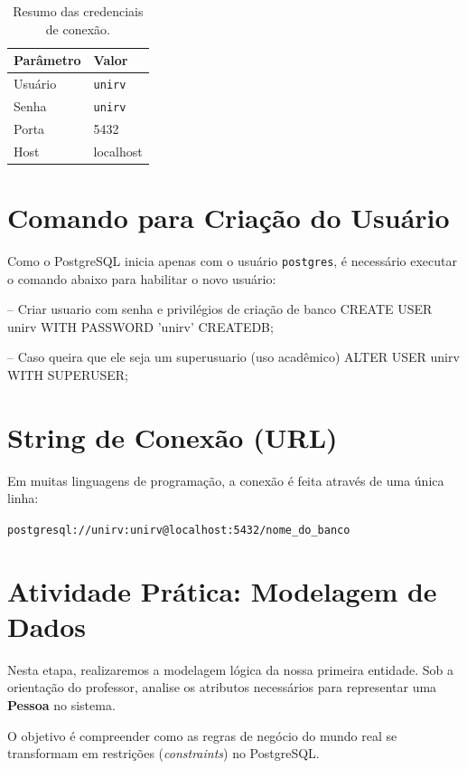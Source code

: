 \begin{table}[h!]
\centering
\begin{tabular}{|l|l|}
\hline
\textbf{Parâmetro} & \textbf{Valor} \\ \hline
Usuário            & \texttt{unirv} \\ \hline
Senha              & \texttt{unirv} \\ \hline
Porta              & 5432           \\ \hline
Host               & localhost      \\ \hline
\end{tabular}
\caption{Resumo das credenciais de conexão.}
\end{table}

\section{Comando para Criação do Usuário}
Como o PostgreSQL inicia apenas com o usuário \texttt{postgres}, é necessário executar o comando abaixo para habilitar o novo usuário:

\begin{sqlcode}
-- Criar usuario com senha e privilégios de criação de banco
CREATE USER unirv WITH PASSWORD 'unirv' CREATEDB;

-- Caso queira que ele seja um superusuario (uso acadêmico)
ALTER USER unirv WITH SUPERUSER;
\end{sqlcode}

\section{String de Conexão (URL)}
Em muitas linguagens de programação, a conexão é feita através de uma única linha:
\begin{center}
    \texttt{postgresql://unirv:unirv@localhost:5432/nome\_do\_banco}
\end{center}


\section{Atividade Prática: Modelagem de Dados}

\begin{tcolorbox}[colback=green!5,colframe=green!40!black,title=Exercício Dirigido com o Professor]
Nesta etapa, realizaremos a modelagem lógica da nossa primeira entidade. Sob a orientação do professor, analise os atributos necessários para representar uma \textbf{Pessoa} no sistema. 

O objetivo é compreender como as regras de negócio do mundo real se transformam em restrições (\textit{constraints}) no PostgreSQL.
\end{tcolorbox}

